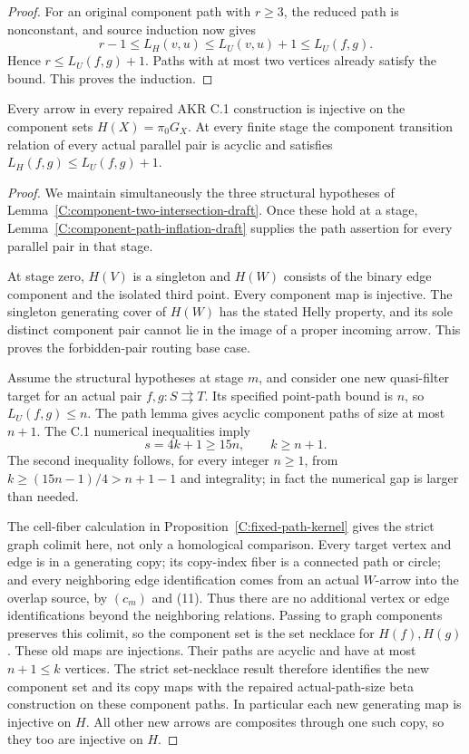 \begin{proof}
For an original component path with $r\geq3$, the reduced path
is nonconstant, and source induction now gives
\[
 r-1\leq L_H(v,u)\leq L_U(v,u)+1\leq L_U(f,g).
\]
Hence $r\leq L_U(f,g)+1$. Paths with at most two vertices
already satisfy the bound. This proves the induction.
\end{proof}

\begin{theorem}
\label{C:universal-components-draft}
Every arrow in every repaired AKR C.1 construction is injective
on the component sets $H(X)=\pi_0G_X$. At every finite stage
the component transition relation of every actual parallel pair
is acyclic and satisfies
$L_H(f,g)\leq L_U(f,g)+1$.
\end{theorem}

\begin{proof}
We maintain simultaneously the three structural hypotheses of
Lemma~\ref{C:component-two-intersection-draft}. Once these hold
at a stage, Lemma~\ref{C:component-path-inflation-draft} supplies
the path assertion for every parallel pair in that stage.

At stage zero, $H(V)$ is a singleton and $H(W)$ consists of the
binary edge component and the isolated third point. Every
component map is injective. The singleton generating cover of
$H(W)$ has the stated Helly property, and its sole distinct
component pair cannot lie in the image of a proper incoming
arrow. This proves the forbidden-pair routing base case.

Assume the structural hypotheses at stage $m$, and consider one
new quasi-filter target for an actual pair $f,g:S\rightrightarrows T$.
Its specified point-path bound is $n$, so
$L_U(f,g)\leq n$. The path lemma gives acyclic component paths
of size at most $n+1$. The C.1 numerical inequalities imply
\[
       s=4k+1\geq15n,\qquad k\geq n+1.
\]
The second inequality follows, for every integer $n\geq1$, from
$k\geq(15n-1)/4>n+1-1$ and integrality; in fact the numerical
gap is larger than needed.

The cell-fiber calculation in
Proposition~\ref{C:fixed-path-kernel} gives the strict graph
colimit here, not only a homological comparison. Every target
vertex and edge is in a generating copy; its copy-index fiber
is a connected path or circle; and every neighboring edge
identification comes from an actual $W$-arrow into the overlap
source, by $(c_m)$ and (11). Thus there are no additional
vertex or edge identifications beyond the neighboring relations.
Passing to graph components preserves this colimit, so the
component set is the set necklace for $H(f),H(g)$.
These old maps are injections. Their paths are acyclic and have
at most $n+1\leq k$ vertices. The strict set-necklace result
therefore identifies the new component set and its copy maps
with the repaired actual-path-size beta construction on these
component paths. In particular each new generating map is
injective on $H$. All other new arrows are composites through
one such copy, so they too are injective on $H$.


\end{proof}
